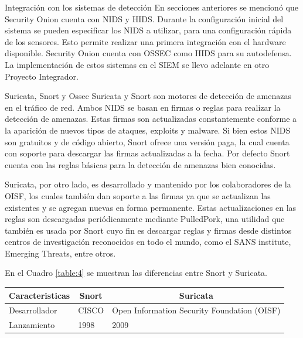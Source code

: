    \begin{section}{Integración con los sistemas de detección}
        En secciones anteriores se mencionó que Security Onion cuenta con NIDS y HIDS. Durante la configuración inicial del sistema se pueden especificar los NIDS a utilizar, para una configuración rápida de los sensores. Esto permite realizar una primera integración con el hardware disponible. Security Onion cuenta con OSSEC como HIDS para su autodefensa. La implementación de estos sistemas en el SIEM se llevo adelante en otro Proyecto Integrador.
   \end{section}
   \pagebreak
   \begin{subsection}{Suricata, Snort y Ossec}
        Suricata y Snort son motores de detección de amenazas en el tráfico de red. Ambos NIDS se basan en firmas o reglas para realizar la detección de amenazas. Estas firmas son actualizadas constantemente conforme a la aparición de nuevos tipos de ataques, exploits y malware. Si bien estos NIDS son gratuitos y de código abierto, Snort ofrece una versión paga, la cual cuenta con soporte para descargar las firmas actualizadas a la fecha. Por defecto Snort cuenta con las reglas básicas para la detección de amenazas bien conocidas. \par
    	Suricata, por otro lado, es desarrollado y mantenido por los colaboradores de la OISF, los cuales también dan soporte a las firmas ya que se actualizan las existentes y se agregan nuevas en forma permanente. Estas actualizaciones en las reglas son descargadas periódicamente mediante PulledPork, una utilidad que también es usada por Snort cuyo fin es descargar reglas y firmas desde distintos centros de investigación reconocidos en todo el mundo, como el SANS institute, Emerging Threats, entre otros. \par
        En el Cuadro \ref{table:4} se muestran las diferencias entre Snort y Suricata.
        \begin{table}[H]
            \centering
            \begin{tabular}{|m{10em}|m{11em}|m{11em}|}
                \hline 
               \multicolumn{1}{|c|}{Caracteristicas} & \multicolumn{1}{c|}{Snort} & \multicolumn{1}{c|}{Suricata}               \\ \hline %
                    Desarrollador & CISCO & Open Information Security Foundation (OISF)  \\ 
                \hline
                    Lanzamiento  & 1998 & 2009 \\ 

\end{tabular}
\end{table}
\end{subsection}
